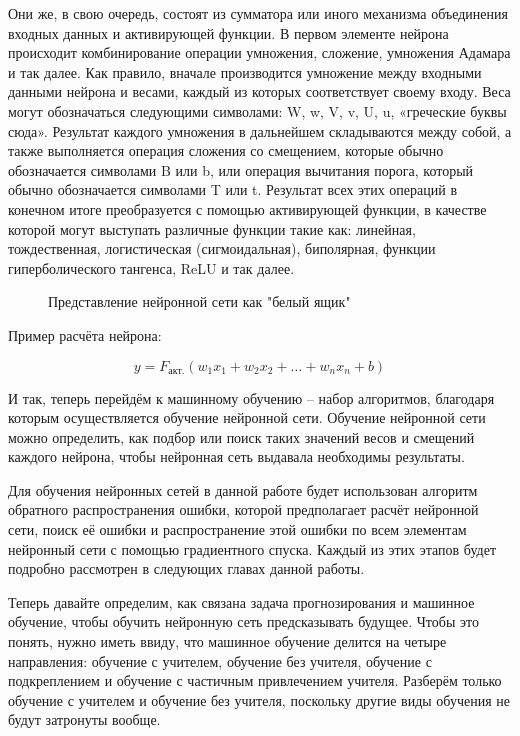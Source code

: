{  \par \redline Они же, в свою очередь, состоят из сумматора или иного механизма объединения входных данных и активирующей функции. В первом элементе нейрона происходит комбинирование операции умножения, сложение, умножения Адамара и так далее. Как правило, вначале производится умножение между входными данными нейрона и весами, каждый из которых соответствует своему входу. Веса могут обозначаться следующими символами: W, w, V, v, U, u, «греческие буквы сюда». Результат каждого умножения в дальнейшем складываются между собой, а также выполняется операция сложения со смещением, которые обычно обозначается символами B или b, или операция вычитания порога, который обычно обозначается символами T или t.  Результат всех этих операций в конечном итоге преобразуется с помощью активирующей функции, в качестве которой могут выступать различные функции такие как: линейная, тождественная, логистическая (сигмоидальная), биполярная, функции гиперболического тангенса, ReLU и так далее.  

  \begin{figure}
    \centering
    \def\svgwidth{\textwidth}
    
    \caption{Представление нейронной сети как "белый ящик"}
    \label{fig:Neuron}
  \end{figure}

  Пример расчёта нейрона:

  \[y = F_{акт.}\left(w_1x_1 + w_2x_2 + \dots + w_nx_n + b\right)\]

  \par \redline И так, теперь перейдём к машинному обучению – набор алгоритмов, благодаря которым осуществляется обучение нейронной сети. Обучение нейронной сети можно определить, как подбор или поиск таких значений весов и смещений каждого нейрона, чтобы нейронная сеть выдавала необходимы результаты. 
  
  \par \redline Для обучения нейронных сетей в данной работе будет использован алгоритм обратного распространения ошибки, которой предполагает расчёт нейронной сети, поиск её ошибки и распространение этой ошибки по всем элементам нейронный сети с помощью градиентного спуска. Каждый из этих этапов будет подробно рассмотрен в следующих главах данной работы.

  \par \redline Теперь давайте определим, как связана задача прогнозирования и машинное обучение, чтобы обучить нейронную сеть предсказывать будущее. Чтобы это понять, нужно иметь ввиду, что машинное обучение делится на четыре направления: обучение с учителем, обучение без учителя, обучение с подкреплением и обучение с частичным привлечением учителя. Разберём только обучение с учителем и обучение без учителя, поскольку другие виды обучения не будут затронуты вообще. 

}

